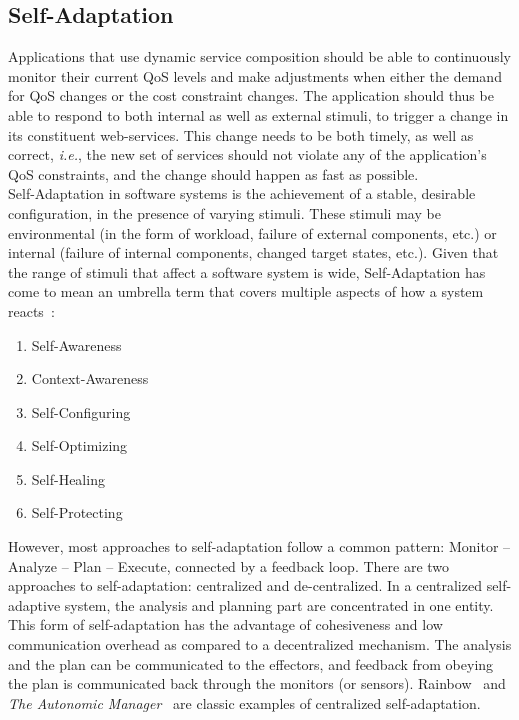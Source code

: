 \documentclass[10pt,journal,compsoc]{IEEEtran}
\begin{document}
\subsection{Self-Adaptation}
Applications that use dynamic service composition should be able to continuously monitor their current QoS levels and make adjustments when either the demand for QoS changes or the cost constraint changes. The application should thus be able to respond to both internal as well as external stimuli, to trigger a change in its constituent web-services. This change needs to be both timely, as well as correct, \textit{i.e.}, the new set of services should not violate any of the application's QoS constraints, and the change should happen as fast as possible.\\
Self-Adaptation in software systems is the achievement of a stable, desirable configuration, in the presence of varying stimuli. These stimuli may be environmental (in the form of workload, failure of external components, etc.) or internal (failure of internal components, changed target states, etc.). Given that the range of stimuli that affect a software system is wide, Self-Adaptation has come to mean an umbrella term that covers multiple aspects of how a system reacts~\cite{Salehie2009Self-adaptive}:
	\begin{enumerate}
	   \item Self-Awareness
	\item Context-Awareness
	\item Self-Configuring
	\item Self-Optimizing
	\item Self-Healing
	\item Self-Protecting 
	\end{enumerate}
However, most approaches to self-adaptation follow a common pattern: Monitor -- Analyze -- Plan -- Execute, connected by a feedback loop. There are two approaches to self-adaptation: centralized and de-centralized.  
In a centralized self-adaptive system, the analysis and planning part are concentrated in one entity. This form of self-adaptation has the advantage of cohesiveness and low communication overhead as compared to a decentralized mechanism. The analysis and the plan can be communicated to the effectors, and feedback from obeying the plan is communicated back through the monitors (or sensors). Rainbow~\cite{Cheng2006Architecture-based} and \textit{The Autonomic Manager}~\cite{IBM2006Architectural} are classic examples of centralized self-adaptation.\\
\end{document}
